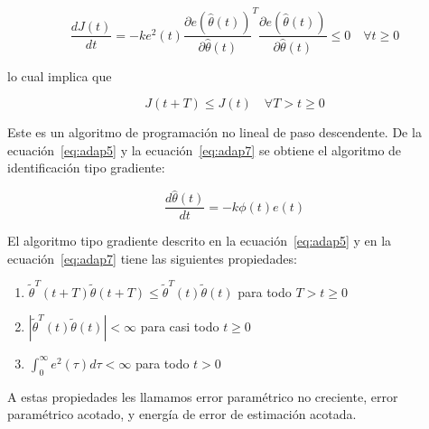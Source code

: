             \begin{equation*}
                \frac{d J(t)}{dt} = -k e^2(t) \frac{\partial e(\hat{\theta}(t))}{\partial \hat{\theta}(t)}^T \frac{\partial e(\hat{\theta}(t))}{\partial \hat{\theta}(t)} \le 0 \quad \forall t \ge 0
            \end{equation*}

            lo cual implica que

            \begin{equation}
                J(t + T) \le J(t) \quad \forall T > t \ge 0
            \end{equation}

            Este es un algoritmo de programación no lineal de paso descendente.
            De la ecuación~\ref{eq:adap5} y la ecuación~\ref{eq:adap7} se obtiene el algoritmo de identificación tipo gradiente:

            \begin{equation} \label{eq:adap7}
                \frac{d \hat{\theta}(t)}{dt} = -k \phi(t) e(t)
            \end{equation}


            \begin{lema}
                El algoritmo tipo gradiente descrito en la ecuación~\ref{eq:adap5} y en la ecuación~\ref{eq:adap7} tiene las siguientes propiedades:

                \begin{enumerate}
                    \item $\tilde{\theta}^T(t + T) \tilde{\theta}(t + T) \le \tilde{\theta}^T(t) \tilde{\theta}(t)$ para todo $T > t \ge 0$
                    \item $\left| \tilde{\theta}^T(t) \tilde{\theta}(t) \right| < \infty$ para casi todo $t \ge 0$
                    \item $\int_0^{\infty} e^2(\tau) d\tau < \infty$ para todo $t > 0$
                \end{enumerate}

                A estas propiedades les llamamos error paramétrico no creciente, error paramétrico acotado, y energía de error de estimación acotada.
            \end{lema}

